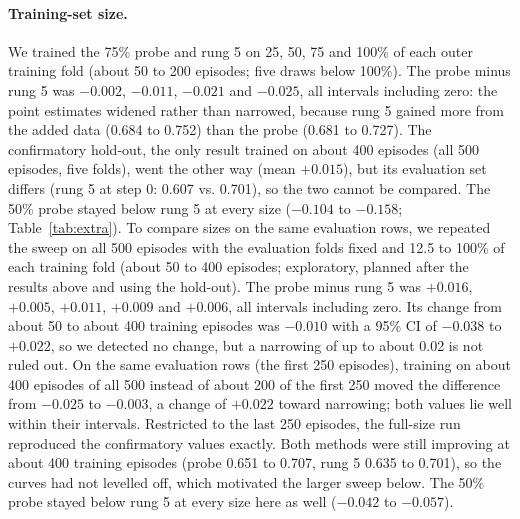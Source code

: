 \documentclass[11pt]{article}
\begin{document}
\paragraph{Training-set size.} We trained the 75\% probe and rung 5 on 25, 50, 75 and 100\% of each outer training fold (about 50 to 200 episodes; five draws below 100\%). The probe minus rung 5 was $-0.002$, $-0.011$, $-0.021$ and $-0.025$, all intervals including zero: the point estimates widened rather than narrowed, because rung 5 gained more from the added data (0.684 to 0.752) than the probe (0.681 to 0.727). The confirmatory hold-out, the only result trained on about 400 episodes (all 500 episodes, five folds), went the other way (mean $+0.015$), but its evaluation set differs (rung 5 at step 0: 0.607 vs. 0.701), so the two cannot be compared. The 50\% probe stayed below rung 5 at every size ($-0.104$ to $-0.158$; Table~\ref{tab:extra}). To compare sizes on the same evaluation rows, we repeated the sweep on all 500 episodes with the evaluation folds fixed and 12.5 to 100\% of each training fold (about 50 to 400 episodes; exploratory, planned after the results above and using the hold-out). The probe minus rung 5 was $+0.016$, $+0.005$, $+0.011$, $+0.009$ and $+0.006$, all intervals including zero. Its change from about 50 to about 400 training episodes was $-0.010$ with a 95\% CI of $-0.038$ to $+0.022$, so we detected no change, but a narrowing of up to about 0.02 is not ruled out. On the same evaluation rows (the first 250 episodes), training on about 400 episodes of all 500 instead of about 200 of the first 250 moved the difference from $-0.025$ to $-0.003$, a change of $+0.022$ toward narrowing; both values lie well within their intervals. Restricted to the last 250 episodes, the full-size run reproduced the confirmatory values exactly. Both methods were still improving at about 400 training episodes (probe 0.651 to 0.707, rung 5 0.635 to 0.701), so the curves had not levelled off, which motivated the larger sweep below. The 50\% probe stayed below rung 5 at every size here as well ($-0.042$ to $-0.057$).
\end{document}
